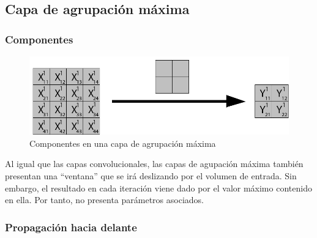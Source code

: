 \subsection{Capa de agrupación máxima}

\subsubsection{Componentes}

\begin{figure}[H]
	\centering
	\includegraphics[scale=0.35]{imagenes/pool_nombres.jpg}  
	\caption{Componentes en una capa de agrupación máxima}
\end{figure}

Al igual que las capas convolucionales, las capas de agupación máxima también presentan una ``ventana'' que se irá deslizando por el volumen de entrada. Sin embargo, el resultado en cada iteración viene dado por el valor máximo contenido en ella. Por tanto, no presenta parámetros asociados.

\subsubsection{Propagación hacia delante}

